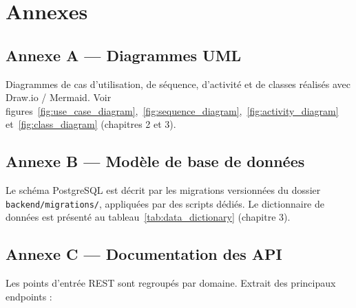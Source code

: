 \chapter*{Annexes}

\section{Annexe A — Diagrammes UML}

Diagrammes de cas d'utilisation, de séquence, d'activité et de classes réalisés avec Draw.io / Mermaid. Voir figures~\ref{fig:use_case_diagram},~\ref{fig:sequence_diagram},~\ref{fig:activity_diagram} et~\ref{fig:class_diagram} (chapitres 2 et 3).

\section{Annexe B — Modèle de base de données}

Le schéma PostgreSQL est décrit par les migrations versionnées du dossier \texttt{backend/migrations/}, appliquées par des scripts dédiés. Le dictionnaire de données est présenté au tableau~\ref{tab:data_dictionary} (chapitre 3).

\section{Annexe C — Documentation des API}

Les points d'entrée REST sont regroupés par domaine. Extrait des principaux endpoints :

